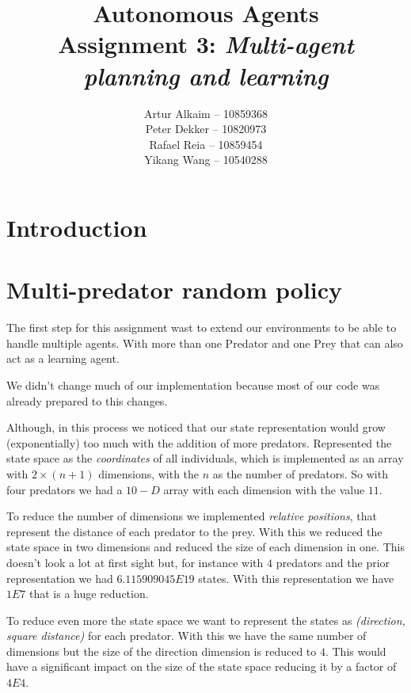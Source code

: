 \documentclass{article}
\begin{document}
\title{Autonomous Agents\\
Assignment 3: \emph{Multi-agent planning and learning}}
\author{
Artur Alkaim -- 10859368\\
Peter Dekker -- 10820973\\
Rafael Reia -- 10859454\\
Yikang Wang -- 10540288\\
}
\maketitle
\section{Introduction}

\section{Multi-predator random policy}
The first step for this assignment wast to extend our environments to be able to
handle multiple agents. With more than one Predator and one Prey that can also
act as a learning agent.

We didn't change much of our implementation because most of our code was
already prepared to this changes.

Although, in this process we noticed that our state representation would grow
(exponentially) too much with the addition of more predators. Represented the
state space as the \emph{coordinates} of all individuals, which is implemented as
an array with $2 \times (n+1)$ dimensions, with the $n$ as the number of predators. So with four predators we had a $10-D$ array with each 
dimension with the value $11$. 

To reduce the number of dimensions we implemented \emph{relative positions},
that represent the distance of each predator to the prey. With this we reduced the
state space in two dimensions and reduced the size of each dimension in one.
This doesn't look a lot at first sight but, for instance with $4$ predators and
the prior representation we had $6.115909045E19$ states. With this
representation we have $1E7$ that is a huge reduction.

To reduce even more the state space we want to represent the states as
\emph{(direction, square distance)} for each predator. With this we have the
same number of dimensions but the size of the direction dimension is reduced to $4$.
This would have a significant impact on the size of the state space reducing it
by a factor of $4E4$.
\end{document}
